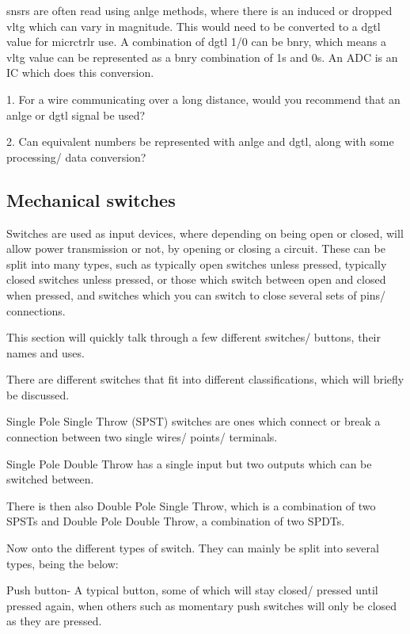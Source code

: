 \documentclass[a4paper,11pt]{report}
\newcommand{\Quiz}[1] %
{
\par\noindent %
\phantomsection %
\todo[inline, color=blue!30]{\textbf{#1}} %
\vspace{1em} %
}
\begin{document}
\gls{snsr}s are often read using \gls{anlge} methods, where there is an induced or dropped \gls{vltg} which can vary in magnitude. This would need to be converted to a \gls{dgtl} value for \gls{micrctrlr} use. A combination of \gls{dgtl} 1/0 can be \gls{bnry}, which means a \gls{vltg} value can be represented as a \gls{bnry} combination of 1s and 0s. An ADC is an IC which does this conversion.

\Quiz{Quiz}

1. For a wire communicating over a long distance, would you recommend that an \gls{anlge} or \gls{dgtl} signal be used?

2. Can equivalent numbers be represented with \gls{anlge} and \gls{dgtl}, along with some processing/ data conversion?

\vspace*{1\baselineskip}

\subsection{Mechanical switches}

Switches are used as input devices, where depending on being open or closed, will allow power transmission or not, by opening or closing a circuit. These can be split into many types, such as typically open switches unless pressed, typically closed switches unless pressed, or those which switch between open and closed when pressed, and switches which you can switch to close several sets of pins/ connections.

This section will quickly talk through a few different switches/ buttons, their names and uses.

There are different switches that fit into different classifications, which will briefly be discussed.

Single Pole Single Throw (SPST) switches are ones which connect or break a connection between two single wires/ points/ terminals.

Single Pole Double Throw has a single input but two outputs which can be switched between.

There is then also Double Pole Single Throw, which is a combination of two SPSTs and Double Pole Double Throw, a combination of two SPDTs.

Now onto the different types of switch. They can mainly be split into several types, being the below:

Push button- A typical button, some of which will stay closed/ pressed until pressed again, when others such as momentary push switches will only be closed as they are pressed.
\end{document}
